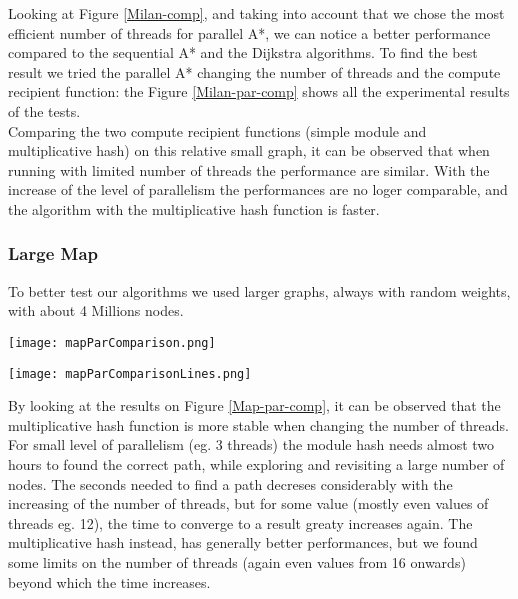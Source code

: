 Looking at Figure \ref{Milan-comp}, and taking into account that we chose the most efficient number of threads for parallel A*,
we can notice a better performance compared to the sequential A* and the Dijkstra algorithms. 
To find the best result we tried the parallel A* changing the number of threads and the compute recipient function:
the Figure \ref{Milan-par-comp} shows all the experimental results of the tests.
\\
Comparing the two compute recipient functions (simple module and multiplicative hash)
on this relative small graph, it can be observed that when running with limited number of threads the performance are similar.
With the increase of the level of parallelism the performances are no loger comparable, and the algorithm with the multiplicative hash function is faster.


\subsubsection{Large Map}

To better test our algorithms we used larger graphs, always with random weights, with about 4 Millions nodes.

\vspace{0.5cm}

\begin{center} 
    \begin{minipage}[b]{0.5\textwidth}
            \centering
            \texttt{[image: mapParComparison.png]}
            \label{Map-par-comp}
        
    \end{minipage}%
    \hspace{1cm}
    \begin{minipage}[b]{0.4\textwidth}
            \centering
            \texttt{[image: mapParComparisonLines.png]}
            \label{Map-par-comp-lines}
    \end{minipage} 
\end{center}

\vspace{0.5cm}

By looking at the results on Figure \ref{Map-par-comp}, it can be observed that the multiplicative hash function is more stable when changing the number of threads.
For small level of parallelism (eg. 3 threads) the module hash needs almost two hours to found the correct path, while exploring and revisiting a large number of nodes.
The seconds needed to find a path decreses considerably with the increasing of the number of threads, but for some value (mostly even values of threads eg. 12), the time to converge to a result greaty increases again.
The multiplicative hash instead, has generally better performances, but we found some limits on the number of threads (again even values from 16 onwards) beyond which the time increases.


